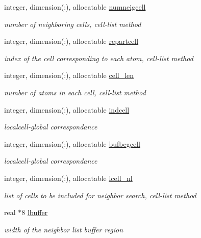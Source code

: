 \begin{DoxyCompactItemize}
integer, dimension(\-:), allocatable \hyperlink{classneigh_a6ecf67821627bc917720dcf2dcd703a6}{numneigcell}
\begin{DoxyCompactList}\small\item\em number of neighboring cells, cell-\/list method \end{DoxyCompactList}\item 
integer, dimension(\-:), allocatable \hyperlink{classneigh_afdbbe58473ef898932aab7d864ac620d}{repartcell}
\begin{DoxyCompactList}\small\item\em index of the cell corresponding to each atom, cell-\/list method \end{DoxyCompactList}\item 
integer, dimension(\-:), allocatable \hyperlink{classneigh_abc2a753a0d9494a2e66da45157c9874c}{cell\-\_\-len}
\begin{DoxyCompactList}\small\item\em number of atoms in each cell, cell-\/list method \end{DoxyCompactList}\item 
integer, dimension(\-:), allocatable \hyperlink{classneigh_a428039ca05098106f98a9b60f506b247}{indcell}
\begin{DoxyCompactList}\small\item\em localcell-\/global correspondance \end{DoxyCompactList}\item 
integer, dimension(\-:), allocatable \hyperlink{classneigh_ad81f20d0ff46ad1b2ec20f56da6928f7}{bufbegcell}
\begin{DoxyCompactList}\small\item\em localcell-\/global correspondance \end{DoxyCompactList}\item 
integer, dimension(\-:), allocatable \hyperlink{classneigh_a99c01d6af3f1b175846fa65ca70f7d9b}{lcell\-\_\-nl}
\begin{DoxyCompactList}\small\item\em list of cells to be included for neighbor search, cell-\/list method \end{DoxyCompactList}\item 
real $\ast$8 \hyperlink{classneigh_a66df6ef3bac2d5562b59b6883a6ae4da}{lbuffer}
\begin{DoxyCompactList}\small\item\em width of the neighbor list buffer region \end{DoxyCompactList}\item 

\end{DoxyCompactItemize}
